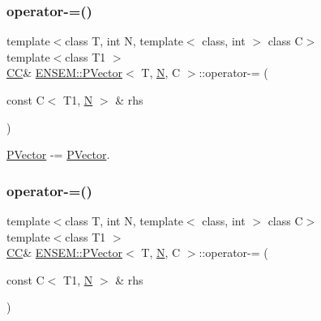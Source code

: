 \subsubsection{\texorpdfstring{operator-\/=()}{operator-=()}\hspace{0.1cm}{\footnotesize\ttfamily [1/3]}}
{\footnotesize\ttfamily template$<$class T, int N, template$<$ class, int $>$ class C$>$ \\
template$<$class T1 $>$ \\
\mbox{\hyperlink{classENSEM_1_1PVector_a92dc0a0a301a3dc96f7be5d337019bc7}{CC}}\& \mbox{\hyperlink{classENSEM_1_1PVector}{E\+N\+S\+E\+M\+::\+P\+Vector}}$<$ T, \mbox{\hyperlink{adat__devel_2lib_2hadron_2operator__name__util_8cc_a7722c8ecbb62d99aee7ce68b1752f337}{N}}, C $>$\+::operator-\/= (\begin{DoxyParamCaption}\item[{const C$<$ T1, \mbox{\hyperlink{adat__devel_2lib_2hadron_2operator__name__util_8cc_a7722c8ecbb62d99aee7ce68b1752f337}{N}} $>$ \&}]{rhs }\end{DoxyParamCaption})\hspace{0.3cm}{\ttfamily [inline]}}



\mbox{\hyperlink{classENSEM_1_1PVector}{P\+Vector}} -\/= \mbox{\hyperlink{classENSEM_1_1PVector}{P\+Vector}}. 

\mbox{\label{classENSEM_1_1PVector_afe4c144dcca484fed4ee1924d1e387be}} 
\subsubsection{\texorpdfstring{operator-\/=()}{operator-=()}\hspace{0.1cm}{\footnotesize\ttfamily [2/3]}}
{\footnotesize\ttfamily template$<$class T, int N, template$<$ class, int $>$ class C$>$ \\
template$<$class T1 $>$ \\
\mbox{\hyperlink{classENSEM_1_1PVector_a92dc0a0a301a3dc96f7be5d337019bc7}{CC}}\& \mbox{\hyperlink{classENSEM_1_1PVector}{E\+N\+S\+E\+M\+::\+P\+Vector}}$<$ T, \mbox{\hyperlink{adat__devel_2lib_2hadron_2operator__name__util_8cc_a7722c8ecbb62d99aee7ce68b1752f337}{N}}, C $>$\+::operator-\/= (\begin{DoxyParamCaption}\item[{const C$<$ T1, \mbox{\hyperlink{adat__devel_2lib_2hadron_2operator__name__util_8cc_a7722c8ecbb62d99aee7ce68b1752f337}{N}} $>$ \&}]{rhs }\end{DoxyParamCaption})\hspace{0.3cm}{\ttfamily [inline]}}



